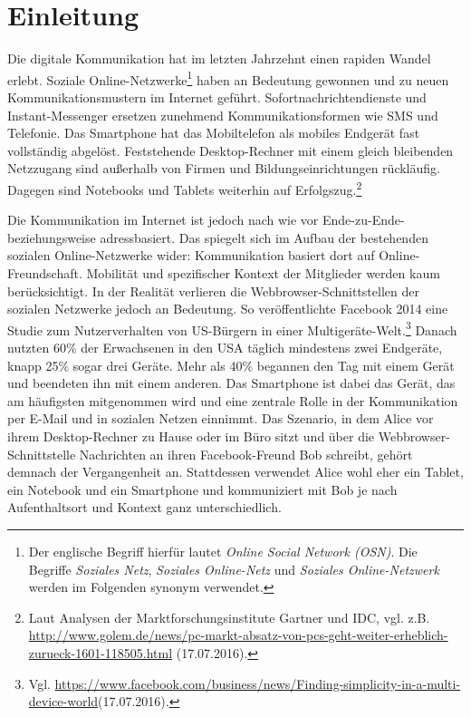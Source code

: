 \chapter{Einleitung}\label{ch:einleitung}
Die digitale Kommunikation hat im letzten Jahrzehnt einen rapiden Wandel erlebt. Soziale Online-Netzwerke\footnote{Der englische Begriff hierfür lautet \textit{Online Social Network (OSN)}. Die Begriffe \textit{Soziales Netz}, \textit{Soziales Online-Netz} und \textit{Soziales Online-Netzwerk} werden im Folgenden synonym verwendet.} haben an Bedeutung gewonnen und zu neuen Kommunikationsmustern im Internet geführt. Sofortnachrichtendienste und Instant-Messenger ersetzen zunehmend Kommunikationsformen wie SMS und Telefonie. Das Smartphone hat das Mobiltelefon als mobiles Endgerät fast vollständig abgelöst. Feststehende Desktop-Rechner mit einem gleich bleibenden Netzzugang sind außerhalb von Firmen und Bildungseinrichtungen rückläufig. Dagegen sind Notebooks und Tablets weiterhin auf Erfolgszug.\footnote{Laut Analysen der Marktforschungsinstitute Gartner und IDC, vgl. z.B. \url{http://www.golem.de/news/pc-markt-absatz-von-pcs-geht-weiter-erheblich-zurueck-1601-118505.html} (17.07.2016).} 

Die Kommunikation im Internet ist jedoch nach wie vor Ende-zu-Ende- beziehungsweise adressbasiert. Das spiegelt sich im Aufbau der bestehenden sozialen Online-Netzwerke wider: Kommunikation basiert dort auf Online-Freundschaft. Mobilität und spezifischer Kontext der Mitglieder werden kaum berücksichtigt. In der Realität verlieren die Web\-brow\-ser-Schnittstellen der sozialen Netzwerke jedoch an Bedeutung. So veröffentlichte Facebook 2014 eine Studie zum Nutzerverhalten von US-Bürgern in einer Multigeräte-Welt.\footnote{Vgl. \url{https://www.facebook.com/business/news/Finding-simplicity-in-a-multi-device-world}\newline (17.07.2016).} Danach nutzten 60\% der Erwachsenen in den USA täglich mindestens zwei Endgeräte, knapp 25\% sogar drei Geräte. Mehr als 40\% begannen den Tag mit einem Gerät und beendeten ihn mit einem anderen. Das Smartphone ist dabei das Gerät, das am häufigsten mitgenommen wird und eine zentrale Rolle in der Kommunikation per E-Mail und in sozialen Netzen einnimmt. Das Szenario, in dem Alice vor ihrem Desktop-Rechner zu Hause oder im Büro sitzt und über die Webbrowser-Schnittstelle Nachrichten an ihren Facebook-Freund Bob schreibt, gehört demnach der Vergangenheit an. Stattdessen verwendet Alice wohl eher ein Tablet, ein Notebook und ein Smartphone und kommuniziert mit Bob je nach Aufenthaltsort und Kontext ganz unterschiedlich. 

